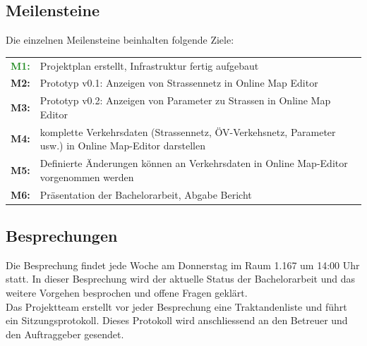 \documentclass[10pt,a4paper]{article}
\begin{document}
\subsection{Meilensteine}
\begin{flushleft}
Die einzelnen Meilensteine beinhalten folgende Ziele:
\end{flushleft}
\begin{tabular}{cl}
	\textcolor{ForestGreen}{\textbf{M1:}} & Projektplan erstellt, Infrastruktur fertig aufgebaut \\[0.2cm]
	\textcolor{NavyBlue}{\textbf{M2:}} & Prototyp v0.1: Anzeigen von Strassennetz in Online Map Editor \\[0.2cm]
	\textcolor{NavyBlue}{\textbf{M3:}} & Prototyp v0.2: Anzeigen von Parameter zu Strassen in Online Map Editor \\[0.2cm]
	\textcolor{NavyBlue}{\textbf{M4:}} & komplette Verkehrsdaten (Strassennetz, ÖV-Verkehsnetz, Parameter usw.) in Online Map-Editor darstellen\\[0.2cm]
	\textcolor{NavyBlue}{\textbf{M5:}} & Definierte Änderungen können an Verkehrsdaten in Online Map-Editor vorgenommen werden\\[0.2cm]
	\textcolor{Dandelion}{\textbf{M6:}} & Präsentation der Bachelorarbeit, Abgabe Bericht\\
\end{tabular}
\subsection{Besprechungen}
\begin{flushleft}
	Die Besprechung findet jede Woche am Donnerstag im Raum 1.167 um 14:00 Uhr statt. In dieser Besprechung wird der aktuelle Status der Bachelorarbeit und das weitere Vorgehen besprochen und offene Fragen geklärt.\\
Das Projektteam erstellt vor jeder Besprechung eine Traktandenliste und führt ein Sitzungsprotokoll. Dieses Protokoll wird anschliessend an den Betreuer und den Auftraggeber gesendet.
\end{flushleft}

\newpage

\end{document}
